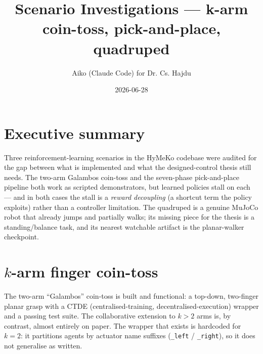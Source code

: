 \documentclass[11pt]{article}
\title{Scenario Investigations --- k-arm coin-toss, pick-and-place, quadruped}
\author{Aiko (Claude Code) for Dr. Cs. Hajdu}
\date{2026-06-28}
\begin{document}
\maketitle

\section*{Executive summary}

Three reinforcement-learning scenarios in the HyMeKo codebase were audited for the
gap between what is implemented and what the designed-control thesis still needs.
The two-arm Galambos coin-toss and the seven-phase pick-and-place pipeline both
work as scripted demonstrators, but learned policies stall on each --- and in
both cases the stall is a \emph{reward decoupling} (a shortcut term the policy
exploits) rather than a controller limitation. The quadruped is a genuine MuJoCo
robot that already jumps and partially walks; its missing piece for the thesis is
a standing/balance task, and its nearest watchable artifact is the planar-walker
checkpoint.

\section{$k$-arm finger coin-toss}

The two-arm ``Galambos'' coin-toss is built and functional: a top-down,
two-finger planar grasp with a CTDE (centralised-training, decentralised-execution)
wrapper and a passing test suite. The collaborative extension to $k>2$ arms is,
by contrast, almost entirely on paper. The wrapper that exists is hardcoded for
$k=2$: it partitions agents by actuator name suffixes (\texttt{\_left} /
\texttt{\_right}), so it does not generalise as written.
\end{document}
